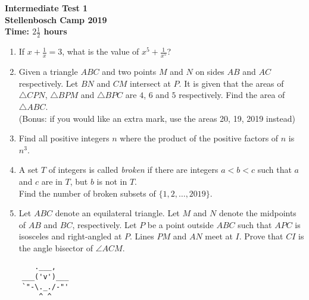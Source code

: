 \documentclass{article}
\begin{document}
\thispagestyle{empty}

\begin{center}
  \textbf{\Large Intermediate Test 1}
  \\ \vspace{1em}
  \textbf{\large Stellenbosch Camp 2019}
  \\ \vspace{1em}
  \textbf{\large Time: $2\frac{1}{2}$ hours}
\end{center}

\vspace{6.81mm}

\begin{enumerate}[1.]

\item %
If $x + \frac{1}{x} = 3$, what is the value of $x^5 + \frac{1}{x^5}$?\\
\vspace{6.81mm}

\item %
Given a triangle $ABC$ and two points $M$ and $N$ on sides $AB$ and $AC$ respectively. Let $BN$ and $CM$ intersect at $P$. It is given that the areas of $\triangle CPN$, $\triangle BPM$ and $\triangle BPC$ are $4$, $6$ and $5$ respectively.
Find the area of $\triangle ABC$.\\
(Bonus: if you would like an extra mark, use the areas 20, 19, 2019 instead)\\
\vspace{6.81mm}

\item %
Find all positive integers $n$ where the product of the positive factors of $n$ is $n^3$.\\
\vspace{6.81mm}

\item %
A set $T$ of integers is called \textit{broken} if there are integers $a < b < c$ such that $a$ and $c$ are in $T$, but $b$ is not in $T$.\\
Find the number of broken subsets of $\{1, 2, \dots, 2019\}$.\\
\vspace{6.81mm}

\item %
Let $ABC$ denote an equilateral triangle. Let $M$ and $N$ denote the midpoints of $AB$ and $BC$, respectively.
Let $P$ be a point outside $ABC$ such that $APC$ is isosceles and right-angled at $P$. Lines $PM$ and $AN$ meet at $I$.
Prove that $CI$ is the angle bisector of $\angle ACM$.\\

\end{enumerate}


\vfill
\begin{center} \begin{BVerbatim}
       .___,   
    ___('v')___
    `"-\._./-"'
        ^ ^ 

\end{BVerbatim} \end{center}
\end{document}
